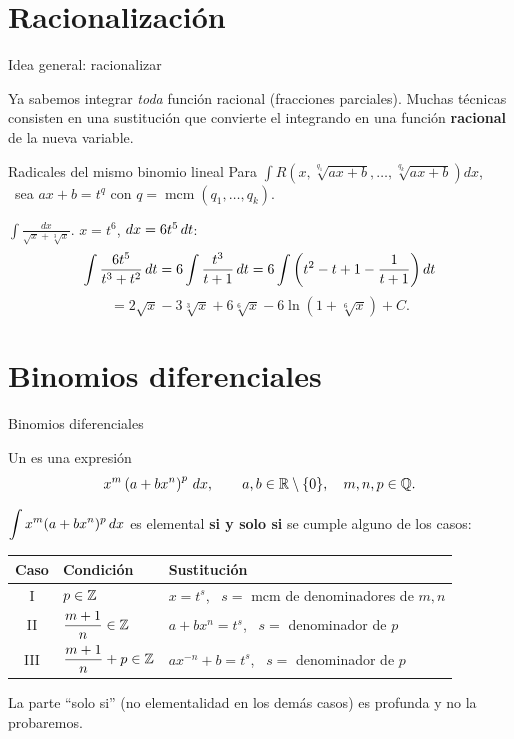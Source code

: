 \documentclass[10pt,aspectratio=169]{beamer}
\begin{document}
\section{Racionalización}

\begin{frame}{Idea general: racionalizar}
  \begin{idea}
    Ya sabemos integrar \emph{toda} función racional (fracciones parciales). Muchas técnicas consisten en una
    sustitución que convierte el integrando en una función \textbf{racional} de la nueva variable.
  \end{idea}
  \begin{block}{Radicales del mismo binomio lineal}
    Para $\displaystyle\int R\left(x,\sqrt[q_1]{ax+b},\dots,\sqrt[q_k]{ax+b}\right)dx$, \ sea $ax+b=t^q$ con $q=\operatorname{mcm}(q_1,\dots,q_k)$.
  \end{block}
  \begin{ejemplo}[1]
    $\displaystyle\int\frac{dx}{\sqrt x+\sqrt[3]x}$. \quad $x=t^6$, $dx=6t^5\,dt$:
    \[ \int\frac{6t^5}{t^3+t^2}\,dt=6\int\frac{t^3}{t+1}\,dt=6\int\left(t^2-t+1-\frac1{t+1}\right)dt \]
    \[ =2\sqrt x-3\sqrt[3]x+6\sqrt[6]x-6\ln\left(1+\sqrt[6]x\right)+C. \]
  \end{ejemplo}
\end{frame}

\section{Binomios diferenciales}

\begin{frame}{Binomios diferenciales}
  \begin{definicion}
    Un  es una expresión
    \[ x^m\left(a+bx^n\right)^p\,dx,\qquad a,b\in\mathbb{R}\setminus\{0\},\quad m,n,p\in\mathbb{Q}. \]
  \end{definicion}
  \begin{teorema}[Chebyshev, 1853]
    $\displaystyle\int x^m(a+bx^n)^p\,dx$ es elemental \textbf{si y solo si} se cumple alguno de los casos:
    \renewcommand{\arraystretch}{1.5}
    \begin{center}
    \begin{tabular}{c|l|l}
      \textbf{Caso} & \textbf{Condición} & \textbf{Sustitución}\\ \hline
      I & $p\in\mathbb{Z}$ & $x=t^s$, \ $s=$ mcm de denominadores de $m,n$\\
      II & $\dfrac{m+1}{n}\in\mathbb{Z}$ & $a+bx^n=t^s$, \ $s=$ denominador de $p$\\
      III & $\dfrac{m+1}{n}+p\in\mathbb{Z}$ & $ax^{-n}+b=t^s$, \ $s=$ denominador de $p$
    \end{tabular}
    \end{center}
  \end{teorema}
  \small La parte ``solo si'' (no elementalidad en los demás casos) es profunda y no la probaremos.
\end{frame}
\end{document}
